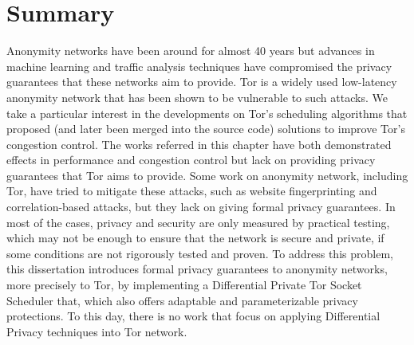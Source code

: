 \section{Summary}\label{sec:related_work_summary}

Anonymity networks have been around for almost 40 years but advances in machine learning and traffic analysis techniques have compromised the privacy guarantees that these networks aim to provide. Tor is a widely used low-latency anonymity network that has been shown to be vulnerable to such attacks. We take a particular interest in the developments on Tor's scheduling algorithms that proposed (and later been merged into the source code) solutions to improve Tor's congestion control. The works referred in this chapter have both demonstrated effects in performance and congestion control but lack on providing privacy guarantees that Tor aims to provide. Some work on anonymity network, including Tor, have tried to mitigate these attacks, such as website fingerprinting and correlation-based attacks, but they lack on giving formal privacy guarantees. In most of the cases, privacy and security are only measured by practical testing, which may not be enough to ensure that the network is secure and private, if some conditions are not rigorously tested and proven. To address this problem, this dissertation introduces formal privacy guarantees to anonymity networks, more precisely to Tor, by implementing a Differential Private Tor Socket Scheduler that, which also offers adaptable and parameterizable privacy protections. To this day, there is no work that focus on applying Differential Privacy techniques into Tor network. 